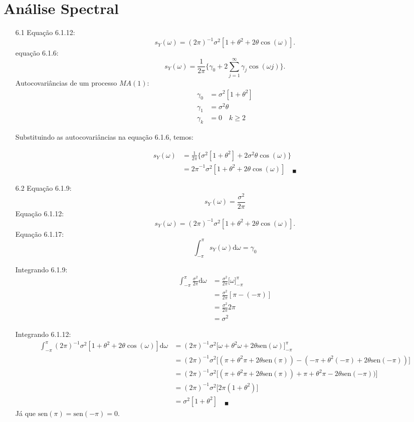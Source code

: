 \chapter{Análise Spectral}

\begin{enumerate}
	\item[6.1]
	Equação 6.1.12: $$s_Y(\omega)=(2\pi)^{-1}\sigma^2[1+\theta^2+2\theta\cos(\omega)].$$
	equação 6.1.6: $$s_Y(\omega)=\frac{1}{2\pi}\bigg\{\gamma_0+2\sum\limits_{j=1}^{\infty}\gamma_j\cos(\omega j)\bigg\}.$$
	Autocovariâncias de um processo $MA(1)$:
	\begin{align*}
	\gamma_0&=\sigma^2[1+\theta^2]\\
	\gamma_1&=\sigma^2\theta\\
	\gamma_k&=0\quad k\geqslant2
	\end{align*}

Substituindo as autocovariâncias na equação 6.1.6, temos:

\begin{align*}
	s_Y(\omega)&=\frac{1}{2\pi}\bigg\{\sigma^2[1+\theta^2]+2\sigma^2\theta\cos(\omega )\bigg\}\\
	&={2\pi}^{-1}\sigma^2[1+\theta^2+2\theta\cos(\omega )]\quad_{\blacksquare}
\end{align*}

	\item[6.2]
	Equação 6.1.9:
	$$s_Y(\omega)=\frac{\sigma^2}{2\pi}$$
	Equação 6.1.12:
	$$s_Y(\omega)=(2\pi)^{-1}\sigma^2[1+\theta^2+2\theta\cos(\omega)].$$
	Equação 6.1.17:
	$$\int_{-\pi}^{\pi}s_Y(\omega)\mathrm{d}\omega=\gamma_0$$

	Integrando 6.1.9:
	\begin{align*}
		\int_{-\pi}^{\pi}\frac{\sigma^2}{2\pi}\mathrm{d}\omega&=\frac{\sigma^2}{2\pi}\bigg[\omega\bigg]^{\pi}_{-\pi}\\
		&=\frac{\sigma^2}{2\pi}[\pi-(-\pi)]\\
		&=\frac{\sigma^2}{2\pi}2\pi\\
		&=\sigma^2
	\end{align*}

	Integrando 6.1.12:
	\begin{align*}
		\int_{-\pi}^{\pi}(2\pi)^{-1}\sigma^2[1+\theta^2+2\theta\cos(\omega)]\mathrm{d}\omega&=(2\pi)^{-1}\sigma^2\bigg[\omega+\theta^2\omega+2\theta\mathrm{sen}(\omega)\bigg]_{-\pi}^{\pi}\\
		&=(2\pi)^{-1}\sigma^2\bigg[(\pi+\theta^2\pi+2\theta\mathrm{sen}(\pi))-(-\pi+\theta^2(-\pi)+2\theta\mathrm{sen}(-\pi))\bigg]\\
		&=(2\pi)^{-1}\sigma^2\bigg[(\pi+\theta^2\pi+2\theta\mathrm{sen}(\pi))+\pi+\theta^2\pi-2\theta\mathrm{sen}(-\pi))\bigg]\\
		&=(2\pi)^{-1}\sigma^2\bigg[2\pi(1+\theta^2)\bigg]\\
		&=\sigma^2[1+\theta^2]\quad_{\blacksquare}
	\end{align*}
Já que $\mathrm{sen}(\pi)=\mathrm{sen}(-\pi)=0$.
\end{enumerate}
